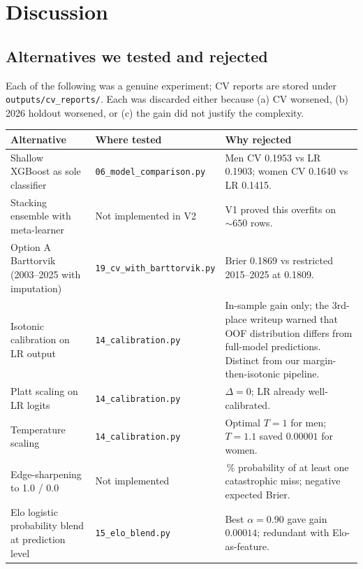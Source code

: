 \documentclass[11pt, a4paper]{article}
\begin{document}
\section{Discussion}
\label{sec:discussion}

\subsection{Alternatives we tested and rejected}
\label{sec:alternatives}

Each of the following was a genuine experiment; CV reports are stored under \texttt{outputs/cv\_reports/}. Each was discarded either because (a) CV worsened, (b) 2026 holdout worsened, or (c) the gain did not justify the complexity.

{\small
\begin{longtable}{@{}>{\raggedright\arraybackslash}p{4.5cm} >{\raggedright\arraybackslash}p{4.2cm} >{\raggedright\arraybackslash}p{5.8cm}@{}}
\toprule
\textbf{Alternative} & \textbf{Where tested} & \textbf{Why rejected} \\
\midrule
\endhead
Shallow XGBoost as sole classifier & \texttt{06\_model\_comparison.py} & Men CV 0.1953 vs LR 0.1903; women CV 0.1640 vs LR 0.1415. \\
Stacking ensemble with meta-learner & Not implemented in V2 & V1 proved this overfits on $\sim\!650$ rows. \\
Option A Barttorvik (2003--2025 with imputation) & \texttt{19\_cv\_with\_barttorvik.py} & Brier 0.1869 vs restricted 2015--2025 at 0.1809. \\
Isotonic calibration on LR output & \texttt{14\_calibration.py} & In-sample gain only; the 3rd-place writeup warned that OOF distribution differs from full-model predictions. Distinct from our margin-then-isotonic pipeline. \\
Platt scaling on LR logits & \texttt{14\_calibration.py} & $\Delta = 0$; LR already well-calibrated. \\
Temperature scaling & \texttt{14\_calibration.py} & Optimal $T = 1$ for men; $T = 1.1$ saved $0.00001$ for women. \\
Edge-sharpening to 1.0 / 0.0 & Not implemented & 65\,\% probability of at least one catastrophic miss; negative expected Brier. \\
Elo logistic probability blend at prediction level & \texttt{15\_elo\_blend.py} & Best $\alpha = 0.90$ gave gain $0.00014$; redundant with Elo-as-feature. \\

\end{longtable}}
\end{document}
